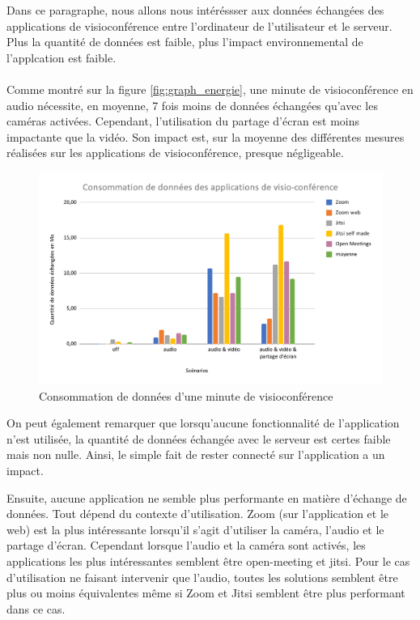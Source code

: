 \documentclass[11pt,a4paper]{report}
\begin{document}
Dans ce paragraphe, nous allons nous intéréssser aux données échangées des applications de visioconférence entre l'ordinateur de l'utilisateur et le serveur. Plus la quantité de données est faible, plus l'impact environnemental de l'applcation est faible.

\paragraph{}
Comme montré sur la figure \ref{fig:graph_energie}, une minute de visioconférence en audio nécessite, en moyenne, 7 fois moins de données échangées qu’avec les caméras activées. Cependant, l'utilisation du partage d'écran est moins impactante que la vidéo. Son impact est, sur la moyenne des différentes mesures réalisées sur les applications de visioconférence, presque négligeable.

\begin{figure}[h]
  \centering
  \includegraphics[width=1\linewidth]{graph_donnees.pdf}
  \caption{Consommation de données d'une minute de visioconférence}
  \label{fig:graph_donne}
\end{figure}

On peut également remarquer que lorsqu'aucune fonctionnalité de l'application n'est utilisée, la quantité de données échangée avec le serveur est certes faible mais non nulle. Ainsi, le simple fait de rester connecté sur l'application a un impact. 

Ensuite, aucune application ne semble plus performante en matière d'échange de données. Tout dépend du contexte d'utilisation. Zoom (sur l'application et le web) est la plus intéressante lorsqu'il s'agit d'utiliser la caméra, l'audio et le partage d'écran. Cependant lorsque l'audio et la caméra sont activés, les applications les plus intéressantes semblent être open-meeting et jitsi. 
Pour le cas d'utilisation ne faisant intervenir que l'audio, toutes les solutions semblent être plus ou moins équivalentes même si Zoom et Jitsi semblent être plus performant dans ce cas.
\end{document}
